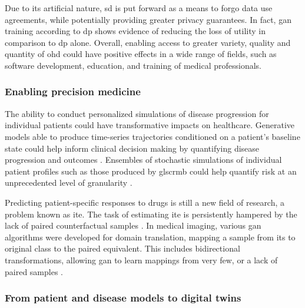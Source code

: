             Due to its artificial nature, \gls{sd} is put forward as a means to forgo data use agreements, while potentially providing greater privacy guarantees\cite{Beaulieu-Jones2019-ct, baowaly_2019_IEEE, baowaly_2019_jamia,esteban2017real,Fisher2019,walsh2020generating, chin2019generation}. In fact, \gls{gan} training according to \gls{dp} shows evidence of reducing the loss of utility in comparison to \gls{dp} alone.  Overall, enabling access to greater variety, quality and quantity of \gls{ohd} could have positive effects in a wide range of fields, such as software development, education, and training of medical professionals. 
    
        \subsubsection{Enabling precision medicine}\label{sec:precision_med}
    
            The ability to conduct personalized simulations of disease progression for individual patients could have transformative impacts on healthcare. Generative models able to produce time-series trajectories conditioned on a patient's baseline state could help inform clinical decision making by quantifying disease progression and outcomes \cite{walsh2020generating, Fisher2019}. Ensembles of stochastic simulations of individual patient profiles such as those produced by gls{crmb} could help quantify risk at an unprecedented level of granularity \cite{Fisher2019}.\par
            Predicting patient-specific responses to drugs is still a new field of research, a problem known as \gls{ite}. The task of estimating \gls{ite} is persistently hampered by the lack of paired counterfactual samples \cite{Yoon2018-ite, chu2019treatment}. In medical imaging, various \gls{gan} algorithms were developed for domain translation, mapping a sample from its to original class to the paired equivalent. This includes bidirectional transformations, allowing \gls{gan} to learn mappings from very few, or a lack of paired samples \cite{Wolterink2017DeepMT}.
    
        \subsubsection{From patient and disease models to digital twins}\label{sec:models_twins}
    
